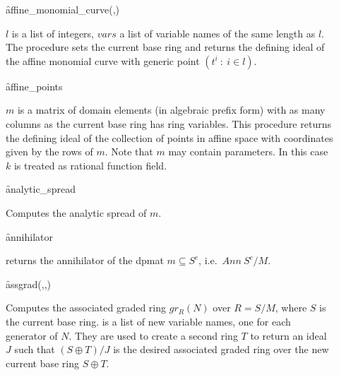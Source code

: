 \begin{description}

\item[]
  \begin{syntax}
    \f{affine\_monomial\_curve}(,)
  \end{syntax}
  \hypertarget{operator:AFFINE_MONOMIAL_CURVE}{}
$l$ is a list of integers, $vars$ a list of variable names of the
same length as $l$. The procedure sets the current base ring and
returns the defining ideal of the affine monomial curve with generic
point $(t^i\ :\ i\in l)$.

\item[]
  \begin{syntax}
    \f{affine\_points} 
  \end{syntax}
  \hypertarget{operator:AFFINE_POINTS}{}
$m$ is a matrix of domain elements (in algebraic prefix form)
with as many columns as the current base ring has ring variables. This
procedure returns the defining ideal of the collection of points in
affine space with coordinates given by the rows of $m$. Note that $m$
may contain parameters. In this case $k$ is treated as rational
function field.

\item[]
  \begin{syntax}
    \f{analytic\_spread} 
  \end{syntax}
  \hypertarget{operator:ANALYTIC_SPREAD}{}
Computes the analytic spread of $m$.

\item[]
  \begin{syntax}
    \f{annihilator} 
  \end{syntax}
  \hypertarget{operator:ANNIHILATOR}{}
returns the annihilator of the dpmat $m\subseteq S^c$, i.e.\
$Ann\ S^c/M$.

\item[]
  \begin{syntax}
    \f{assgrad}(,,)
  \end{syntax}
  \hypertarget{operator:ASSGRAD}{}
Computes the associated graded ring $gr_R(N)$ over $R=S/M$, where
$S$ is the current
base ring.  is a list of new variable names, one for
each generator of $N$.  They are used to create a second ring $T$
to return an ideal $J$ such that $(S\oplus T)/J$ is the desired
associated graded ring over the new current base ring $S\oplus T$.


\end{description}

